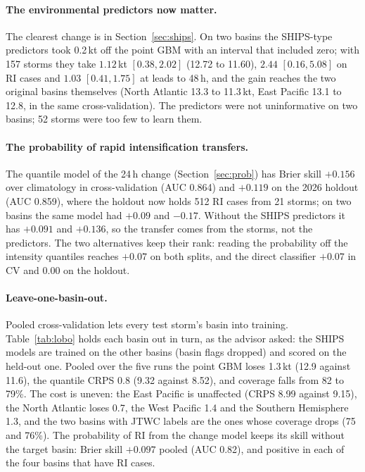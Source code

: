 \documentclass[11pt]{article}
\begin{document}
\paragraph{The environmental predictors now matter.} The clearest change is in
Section~\ref{sec:ships}. On two basins the SHIPS-type predictors took 0.2\,kt off the point GBM
with an interval that included zero; with 157 storms they take $1.12$\,kt $[0.38, 2.02]$
(12.72 to 11.60), $2.44$ $[0.16, 5.08]$ on RI cases and $1.03$ $[0.41, 1.75]$ at leads to
48\,h, and the gain reaches the two original basins themselves (North Atlantic 13.3 to
11.3\,kt, East Pacific 13.1 to 12.8, in the same cross-validation). The predictors were not
uninformative on two basins; 52 storms were too few to learn them.

\paragraph{The probability of rapid intensification transfers.} The quantile model of the 24\,h
change (Section~\ref{sec:prob}) has Brier skill $+0.156$ over climatology in cross-validation
(AUC 0.864) and $+0.119$ on the 2026 holdout (AUC 0.859), where the holdout now holds 512 RI
cases from 21 storms; on two basins the same model had $+0.09$ and $-0.17$. Without the SHIPS
predictors it has $+0.091$ and $+0.136$, so the transfer comes from the storms, not the
predictors. The two alternatives keep their rank: reading the probability off the intensity
quantiles reaches $+0.07$ on both splits, and the direct classifier $+0.07$ in CV and $0.00$ on
the holdout.

\paragraph{Leave-one-basin-out.} Pooled cross-validation lets every test storm's basin into
training. Table~\ref{tab:lobo} holds each basin out in turn, as the advisor asked: the SHIPS
models are trained on the other basins (basin flags dropped) and scored on the held-out one.
Pooled over the five runs the point GBM loses 1.3\,kt (12.9 against 11.6), the quantile CRPS
0.8 (9.32 against 8.52), and coverage falls from 82 to 79\%. The cost is uneven: the East
Pacific is unaffected (CRPS 8.99 against 9.15), the North Atlantic loses 0.7, the West Pacific
1.4 and the Southern Hemisphere 1.3, and the two basins with JTWC labels are the ones whose
coverage drops (75 and 76\%). The probability of RI from the change model keeps its skill
without the target basin: Brier skill $+0.097$ pooled (AUC 0.82), and positive in each of the
four basins that have RI cases.
\end{document}
